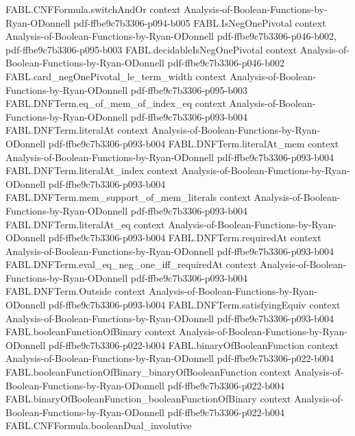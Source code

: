 \begin{theorem}
\proofstep
  {FABL.CNFFormula.switchAndOr}
  {context}
  {Analysis-of-Boolean-Functions-by-Ryan-ODonnell}
  {pdf-ffbe9c7b3306-p094-b005}
\proofstep
  {FABL.IsNegOnePivotal}
  {context}
  {Analysis-of-Boolean-Functions-by-Ryan-ODonnell}
  {pdf-ffbe9c7b3306-p046-b002,
    pdf-ffbe9c7b3306-p095-b003}
\proofstep
  {FABL.decidableIsNegOnePivotal}
  {context}
  {Analysis-of-Boolean-Functions-by-Ryan-ODonnell}
  {pdf-ffbe9c7b3306-p046-b002}
\proofstep
  {FABL.card_negOnePivotal_le_term_width}
  {context}
  {Analysis-of-Boolean-Functions-by-Ryan-ODonnell}
  {pdf-ffbe9c7b3306-p095-b003}
\proofstep
  {FABL.DNFTerm.eq_of_mem_of_index_eq}
  {context}
  {Analysis-of-Boolean-Functions-by-Ryan-ODonnell}
  {pdf-ffbe9c7b3306-p093-b004}
\proofstep
  {FABL.DNFTerm.literalAt}
  {context}
  {Analysis-of-Boolean-Functions-by-Ryan-ODonnell}
  {pdf-ffbe9c7b3306-p093-b004}
\proofstep
  {FABL.DNFTerm.literalAt_mem}
  {context}
  {Analysis-of-Boolean-Functions-by-Ryan-ODonnell}
  {pdf-ffbe9c7b3306-p093-b004}
\proofstep
  {FABL.DNFTerm.literalAt_index}
  {context}
  {Analysis-of-Boolean-Functions-by-Ryan-ODonnell}
  {pdf-ffbe9c7b3306-p093-b004}
\proofstep
  {FABL.DNFTerm.mem_support_of_mem_literals}
  {context}
  {Analysis-of-Boolean-Functions-by-Ryan-ODonnell}
  {pdf-ffbe9c7b3306-p093-b004}
\proofstep
  {FABL.DNFTerm.literalAt_eq}
  {context}
  {Analysis-of-Boolean-Functions-by-Ryan-ODonnell}
  {pdf-ffbe9c7b3306-p093-b004}
\proofstep
  {FABL.DNFTerm.requiredAt}
  {context}
  {Analysis-of-Boolean-Functions-by-Ryan-ODonnell}
  {pdf-ffbe9c7b3306-p093-b004}
\proofstep
  {FABL.DNFTerm.eval_eq_neg_one_iff_requiredAt}
  {context}
  {Analysis-of-Boolean-Functions-by-Ryan-ODonnell}
  {pdf-ffbe9c7b3306-p093-b004}
\proofstep
  {FABL.DNFTerm.Outside}
  {context}
  {Analysis-of-Boolean-Functions-by-Ryan-ODonnell}
  {pdf-ffbe9c7b3306-p093-b004}
\proofstep
  {FABL.DNFTerm.satisfyingEquiv}
  {context}
  {Analysis-of-Boolean-Functions-by-Ryan-ODonnell}
  {pdf-ffbe9c7b3306-p093-b004}
\proofstep
  {FABL.booleanFunctionOfBinary}
  {context}
  {Analysis-of-Boolean-Functions-by-Ryan-ODonnell}
  {pdf-ffbe9c7b3306-p022-b004}
\proofstep
  {FABL.binaryOfBooleanFunction}
  {context}
  {Analysis-of-Boolean-Functions-by-Ryan-ODonnell}
  {pdf-ffbe9c7b3306-p022-b004}
\proofstep
  {FABL.booleanFunctionOfBinary_binaryOfBooleanFunction}
  {context}
  {Analysis-of-Boolean-Functions-by-Ryan-ODonnell}
  {pdf-ffbe9c7b3306-p022-b004}
\proofstep
  {FABL.binaryOfBooleanFunction_booleanFunctionOfBinary}
  {context}
  {Analysis-of-Boolean-Functions-by-Ryan-ODonnell}
  {pdf-ffbe9c7b3306-p022-b004}
\proofstep
  {FABL.CNFFormula.booleanDual_involutive}

\end{theorem}
